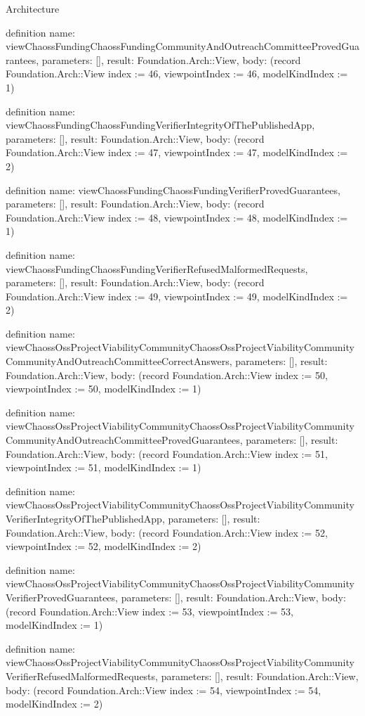 \begin{lexlean}{Architecture}
\begin{semanticmodule}
definition{
  name: viewChaossFundingChaossFundingCommunityAndOutreachCommitteeProvedGuarantees,
  parameters: [],
  result: Foundation.Arch::View,
  body: (record Foundation.Arch::View {index := 46, viewpointIndex := 46, modelKindIndex := 1})
}

definition{
  name: viewChaossFundingChaossFundingVerifierIntegrityOfThePublishedApp,
  parameters: [],
  result: Foundation.Arch::View,
  body: (record Foundation.Arch::View {index := 47, viewpointIndex := 47, modelKindIndex := 2})
}

definition{
  name: viewChaossFundingChaossFundingVerifierProvedGuarantees,
  parameters: [],
  result: Foundation.Arch::View,
  body: (record Foundation.Arch::View {index := 48, viewpointIndex := 48, modelKindIndex := 1})
}

definition{
  name: viewChaossFundingChaossFundingVerifierRefusedMalformedRequests,
  parameters: [],
  result: Foundation.Arch::View,
  body: (record Foundation.Arch::View {index := 49, viewpointIndex := 49, modelKindIndex := 2})
}

definition{
  name: viewChaossOssProjectViabilityCommunityChaossOssProjectViabilityCommunityCommunityAndOutreachCommitteeCorrectAnswers,
  parameters: [],
  result: Foundation.Arch::View,
  body: (record Foundation.Arch::View {index := 50, viewpointIndex := 50, modelKindIndex := 1})
}

definition{
  name: viewChaossOssProjectViabilityCommunityChaossOssProjectViabilityCommunityCommunityAndOutreachCommitteeProvedGuarantees,
  parameters: [],
  result: Foundation.Arch::View,
  body: (record Foundation.Arch::View {index := 51, viewpointIndex := 51, modelKindIndex := 1})
}

definition{
  name: viewChaossOssProjectViabilityCommunityChaossOssProjectViabilityCommunityVerifierIntegrityOfThePublishedApp,
  parameters: [],
  result: Foundation.Arch::View,
  body: (record Foundation.Arch::View {index := 52, viewpointIndex := 52, modelKindIndex := 2})
}

definition{
  name: viewChaossOssProjectViabilityCommunityChaossOssProjectViabilityCommunityVerifierProvedGuarantees,
  parameters: [],
  result: Foundation.Arch::View,
  body: (record Foundation.Arch::View {index := 53, viewpointIndex := 53, modelKindIndex := 1})
}

definition{
  name: viewChaossOssProjectViabilityCommunityChaossOssProjectViabilityCommunityVerifierRefusedMalformedRequests,
  parameters: [],
  result: Foundation.Arch::View,
  body: (record Foundation.Arch::View {index := 54, viewpointIndex := 54, modelKindIndex := 2})
}


\end{semanticmodule}
\end{lexlean}
